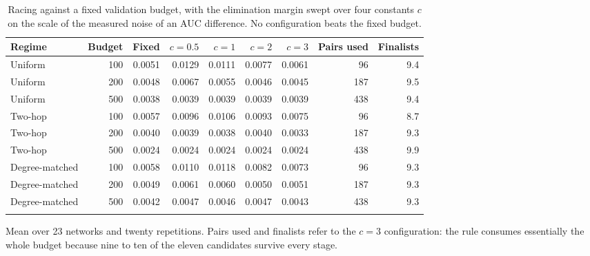 \begin{table}[htbp]
\centering
\scriptsize
\setlength{\tabcolsep}{4pt}
\caption{Racing against a fixed validation budget, with the elimination margin swept over four constants $c$ on the scale of the measured noise of an AUC difference. No configuration beats the fixed budget.}
\label{tab:racing}
\begin{tabular}{l r r r r r r r r}
\toprule
Regime & Budget & Fixed & $c=0.5$ & $c=1$ & $c=2$ & $c=3$ & Pairs used & Finalists \\
\midrule
Uniform & 100 & 0.0051 & 0.0129 & 0.0111 & 0.0077 & 0.0061 & 96 & 9.4 \\
Uniform & 200 & 0.0048 & 0.0067 & 0.0055 & 0.0046 & 0.0045 & 187 & 9.5 \\
Uniform & 500 & 0.0038 & 0.0039 & 0.0039 & 0.0039 & 0.0039 & 438 & 9.4 \\
\addlinespace[2pt]
Two-hop & 100 & 0.0057 & 0.0096 & 0.0106 & 0.0093 & 0.0075 & 96 & 8.7 \\
Two-hop & 200 & 0.0040 & 0.0039 & 0.0038 & 0.0040 & 0.0033 & 187 & 9.3 \\
Two-hop & 500 & 0.0024 & 0.0024 & 0.0024 & 0.0024 & 0.0024 & 438 & 9.9 \\
\addlinespace[2pt]
Degree-matched & 100 & 0.0058 & 0.0110 & 0.0118 & 0.0082 & 0.0073 & 96 & 9.3 \\
Degree-matched & 200 & 0.0049 & 0.0061 & 0.0060 & 0.0050 & 0.0051 & 187 & 9.3 \\
Degree-matched & 500 & 0.0042 & 0.0047 & 0.0046 & 0.0047 & 0.0043 & 438 & 9.3 \\
\addlinespace[2pt]
\bottomrule
\end{tabular}
\par\vspace{2pt}\begin{minipage}{\linewidth}\footnotesize Mean over 23 networks and twenty repetitions. Pairs used and finalists refer to the $c=3$ configuration: the rule consumes essentially the whole budget because nine to ten of the eleven candidates survive every stage.\end{minipage}
\end{table}
